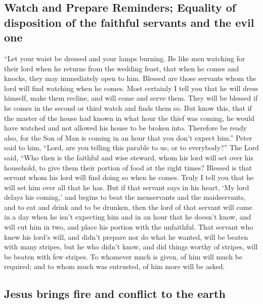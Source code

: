 \hypertarget{watch-and-prepare-reminders-equality-of-disposition-of-the-faithful-servants-and-the-evil-one}{%
\subsection{Watch and Prepare Reminders; Equality of disposition of the
faithful servants and the evil
one}\label{watch-and-prepare-reminders-equality-of-disposition-of-the-faithful-servants-and-the-evil-one}}

 ``Let your waist be dressed and your lamps burning.
 Be like men watching for their lord when he returns from
the wedding feast, that when he comes and knocks, they may immediately
open to him.  Blessed are those servants whom the lord
will find watching when he comes. Most certainly I tell you that he will
dress himself, make them recline, and will come and serve them.
 They will be blessed if he comes in the second or third
watch and finds them so.  But know this, that if the
master of the house had known in what hour the thief was coming, he
would have watched and not allowed his house to be broken into.
 Therefore be ready also, for the Son of Man is coming in
an hour that you don't expect him.''  Peter said to him,
``Lord, are you telling this parable to us, or to everybody?''
 The Lord said, ``Who then is the faithful and wise
steward, whom his lord will set over his household, to give them their
portion of food at the right times?  Blessed is that
servant whom his lord will find doing so when he comes. 
Truly I tell you that he will set him over all that he has.
 But if that servant says in his heart, `My lord delays
his coming,' and begins to beat the menservants and the maidservants,
and to eat and drink and to be drunken,  then the lord of
that servant will come in a day when he isn't expecting him and in an
hour that he doesn't know, and will cut him in two, and place his
portion with the unfaithful.  That servant who knew his
lord's will, and didn't prepare nor do what he wanted, will be beaten
with many stripes,  but he who didn't know, and did
things worthy of stripes, will be beaten with few stripes. To whomever
much is given, of him will much be required; and to whom much was
entrusted, of him more will be asked.

\hypertarget{jesus-brings-fire-and-conflict-to-the-earth}{%
\subsection{Jesus brings fire and conflict to the
earth}\label{jesus-brings-fire-and-conflict-to-the-earth}}

